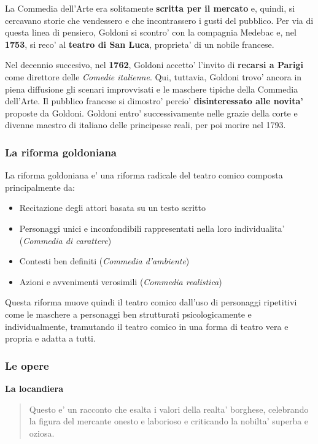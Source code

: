 \documentclass{article}
\begin{document}
{{    La Commedia dell'Arte era solitamente \textbf{scritta per il mercato} e, quindi, si cercavano storie che vendessero e che incontrassero i gusti del pubblico. Per via di questa linea di pensiero, Goldoni si scontro' con la compagnia Medebac e, nel \textbf{1753}, si reco' al \textbf{teatro di San Luca}, proprieta' di un nobile francese.

    Nel decennio succesivo, nel \textbf{1762}, Goldoni accetto' l'invito di \textbf{recarsi a Parigi} come direttore delle \textit{Comedie italienne}. Qui, tuttavia, Goldoni trovo' ancora in piena diffusione gli scenari improvvisati e le maschere tipiche della Commedia dell'Arte. Il pubblico francese si dimostro' percio' \textbf{disinteressato alle novita'} proposte da Goldoni. Goldoni entro' successivamente nelle grazie della corte e divenne maestro di italiano delle principesse reali, per poi morire nel 1793.

    \subsubsection{La riforma goldoniana} %
    La riforma goldoniana e' una riforma radicale del teatro comico composta principalmente da:
    
    \begin{itemize}
      \item Recitazione degli attori basata su un testo scritto
      \item Personaggi unici e inconfondibili rappresentati nella loro individualita' (\textit{Commedia di carattere})
      \item Contesti ben definiti (\textit{Commedia d'ambiente})
      \item Azioni e avvenimenti verosimili (\textit{Commedia realistica})
    \end{itemize}

    Questa riforma muove quindi il teatro comico dall'uso di personaggi ripetitivi come le maschere a personaggi ben strutturati psicologicamente e individualmente, tramutando il teatro comico in una forma di teatro vera e propria e adatta a tutti.

    \subsubsection{Le opere} %
    \textbf{La locandiera}
    \begin{quote}
      Questo e' un racconto che esalta i valori della realta' borghese, celebrando la figura del mercante onesto e laborioso e criticando la nobilta' superba e oziosa.
    \end{quote}

}}
\end{document}
